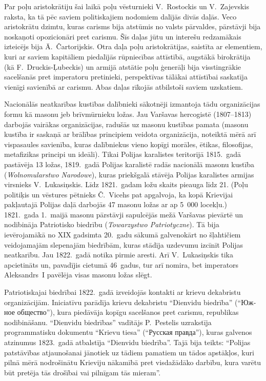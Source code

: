 \documentclass[twoside,a5paper,12pt,fleqn,openany]{extbook}
\newcommand{\pltxti}[1]{\textit{\textpolish{#1}}}
\newcommand{\rutxti}[1]{\textrussian{#1}}
\begin{document}
Par poļu aristokrātiju šai laikā poļu vēsturnieki V.~Rostockis un V.~Zajevskis raksta, ka tā pēc saviem politiskajiem nodomiem dalījās divās daļās. Veco aristokrātu dzimtu, kuras carisms bija atstūmis no valsts pārvaldes, pārstāvji bija noskaņoti opozicionāri pret carismu. Šīs daļas jūtu un interešu redzamākais izteicējs bija Ā.~Čartorijskis. Otra daļa poļu aristokrātijas, saistīta ar elementiem, kuri ar saviem kapitāliem piedalījās rūpniecības attīstībā, augstākā birokrātija (kā F.~Druckis-Ļubeckis) un armijā atstātie poļu ģenerāļi bija visstingrākie sacelšanās pret imperatoru pretinieki, perspektīvas tālākai attīstībai saskatīja vienīgi savienībā ar carismu. Abas daļas rīkojās atbilstoši saviem uzskatiem.

Nacionālās neatkarības kustības dalībnieki sākotnēji izmantoja tādu organizācijas formu kā masonu jeb brīvmūrnieku ložas. Jau Varšavas hercogistē (1807--1813) darbojās vairākas organizācijas, radušās uz masonu kustības pamata (masonu kustība ir saskaņā ar brālības principiem veidota organizācija, noteiktā mērā arī vispasaules savienība, kuras dalībniekus vieno kopīgi morāles, ētikas, filosofijas, metafizikas principi un ideāli). Tikai Polijas karalistes teritorijā 1815.~gadā pastāvēja 13 ložas, 1819.~gadā Polijas karalistē radās nacionālā masonu kustība (\pltxti{Wolnomularstwo Narodowe}), kuras priekšgalā stāvēja Polijas karalistes armijas virsnieks V.~Lukasiņskis. Līdz 1821.~gadam ložu skaits pieauga līdz 21. (Poļu politiķis un vēstures pētnieks Č.~Vicehs pat apgalvoja, ka kopā Krievijai pakļautajā Polijas daļā darbojās 47 masonu ložas ar ap 5~000 locekļu.) 1821.~gada 1.~maijā masonu pārstāvji sapulcējās mežā Varšavas pievārtē un nodibināja Patriotisko biedrību (\pltxti{Towarzystwo Patriotyczne}). Tā bija ievērojamākā no XIX gadsimta 20.~gadu sākumā galvenokārt no šļahtičiem veidojamajām slepenajām biedrībām, kuras stādīja uzdevumu izcīnīt Polijas neatkarību. Jau 1822.~gadā notika pirmie aresti. Arī V.~Lukasiņskis tika apcietināts un, pavadījis cietumā 46~gadus, tur arī nomira, bet imperators Aleksandrs~I pavēlēja visas masonu ložas slēgt.

Patriotiskajai biedrībai 1822.~gadā izveidojās kontakti ar krievu dekabristu organizācijām. Iniciatīvu parādīja krievu dekabristu ``Dienvidu biedrība'' (``\rutxti{Южное общество}''), kura piedāvāja kopīgu sacelšanos pret carismu, republikas nodibināšanu. ``Dienvidu biedrības'' vadītājs P.~Pestelis uzrakstīja programmatisku dokumentu ``Krievu tiesa'' (``\rutxti{Русская правда}''), kuras galvenos atzinumus 1823.~gadā atbalstīja ``Dienvidu biedrība''. Tajā bija teikts: ``Polijas patstāvības atjaunošanai jānotiek uz tādiem pamatiem un tādos apstākļos, kuri pilnā mērā nodrošinātu Krieviju nākamībā pret visdažādāko darbību, kura varētu būt pretēja tās drošībai vai pilnīgam tās mieram''.
\end{document}
